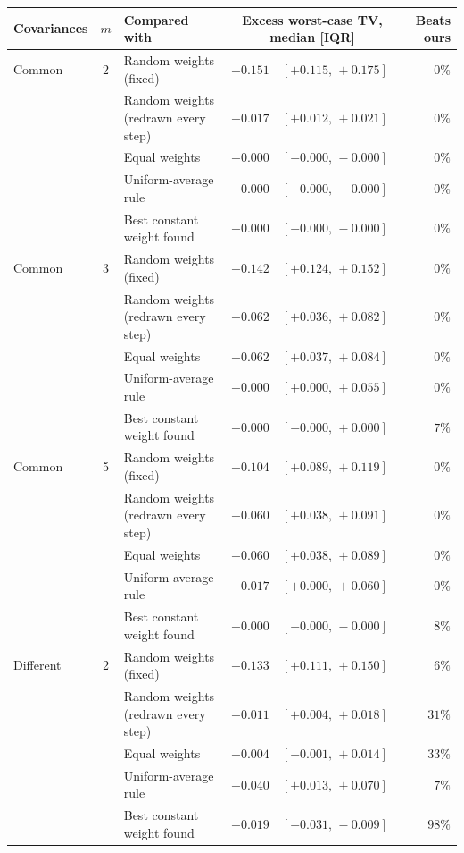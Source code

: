 \begin{table}[t]
\centering
\small
\setlength{\tabcolsep}{5pt}
\begin{tabular}{lcl r@{\;}l r}
\toprule
Covariances & $m$ & Compared with & \multicolumn{2}{c}{Excess worst-case TV, median [IQR]} & Beats ours \\
\midrule
Common & 2 & Random weights (fixed) & $+0.151$ & $[+0.115,\,+0.175]$ & $0\%$ \\
 &  & Random weights (redrawn every step) & $+0.017$ & $[+0.012,\,+0.021]$ & $0\%$ \\
 &  & Equal weights & $-0.000$ & $[-0.000,\,-0.000]$ & $0\%$ \\
 &  & Uniform-average rule & $-0.000$ & $[-0.000,\,-0.000]$ & $0\%$ \\
 &  & Best constant weight found & $-0.000$ & $[-0.000,\,-0.000]$ & $0\%$ \\
\addlinespace
Common & 3 & Random weights (fixed) & $+0.142$ & $[+0.124,\,+0.152]$ & $0\%$ \\
 &  & Random weights (redrawn every step) & $+0.062$ & $[+0.036,\,+0.082]$ & $0\%$ \\
 &  & Equal weights & $+0.062$ & $[+0.037,\,+0.084]$ & $0\%$ \\
 &  & Uniform-average rule & $+0.000$ & $[+0.000,\,+0.055]$ & $0\%$ \\
 &  & Best constant weight found & $-0.000$ & $[-0.000,\,+0.000]$ & $7\%$ \\
\addlinespace
Common & 5 & Random weights (fixed) & $+0.104$ & $[+0.089,\,+0.119]$ & $0\%$ \\
 &  & Random weights (redrawn every step) & $+0.060$ & $[+0.038,\,+0.091]$ & $0\%$ \\
 &  & Equal weights & $+0.060$ & $[+0.038,\,+0.089]$ & $0\%$ \\
 &  & Uniform-average rule & $+0.017$ & $[+0.000,\,+0.060]$ & $0\%$ \\
 &  & Best constant weight found & $-0.000$ & $[-0.000,\,-0.000]$ & $8\%$ \\
\addlinespace
Different & 2 & Random weights (fixed) & $+0.133$ & $[+0.111,\,+0.150]$ & $6\%$ \\
 &  & Random weights (redrawn every step) & $+0.011$ & $[+0.004,\,+0.018]$ & $31\%$ \\
 &  & Equal weights & $+0.004$ & $[-0.001,\,+0.014]$ & $33\%$ \\
 &  & Uniform-average rule & $+0.040$ & $[+0.013,\,+0.070]$ & $7\%$ \\
 &  & Best constant weight found & $-0.019$ & $[-0.031,\,-0.009]$ & $98\%$ \\

\end{tabular}
\end{table}
